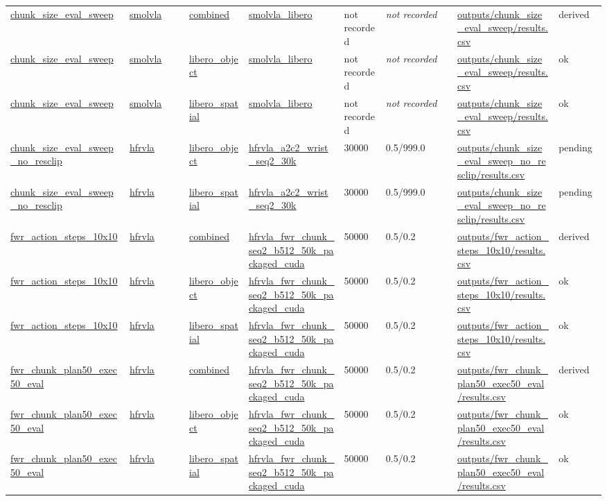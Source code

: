 \begin{scriptsize}
\begin{longtable}{@{}p{0.20\linewidth}p{0.10\linewidth}p{0.10\linewidth}p{0.16\linewidth}p{0.07\linewidth}p{0.12\linewidth}p{0.17\linewidth}p{0.08\linewidth}@{}}
\url{chunk_size_eval_sweep} & \url{smolvla} & \url{combined} & \url{smolvla_libero} & not recorded & \emph{not recorded} & \url{outputs/chunk_size_eval_sweep/results.csv} & derived \\
\url{chunk_size_eval_sweep} & \url{smolvla} & \url{libero_object} & \url{smolvla_libero} & not recorded & \emph{not recorded} & \url{outputs/chunk_size_eval_sweep/results.csv} & ok \\
\url{chunk_size_eval_sweep} & \url{smolvla} & \url{libero_spatial} & \url{smolvla_libero} & not recorded & \emph{not recorded} & \url{outputs/chunk_size_eval_sweep/results.csv} & ok \\
\url{chunk_size_eval_sweep_no_resclip} & \url{hfrvla} & \url{libero_object} & \url{hfrvla_a2c2_wrist_seq2_30k} & 30000 & 0.5/999.0 & \url{outputs/chunk_size_eval_sweep_no_resclip/results.csv} & pending \\
\url{chunk_size_eval_sweep_no_resclip} & \url{hfrvla} & \url{libero_spatial} & \url{hfrvla_a2c2_wrist_seq2_30k} & 30000 & 0.5/999.0 & \url{outputs/chunk_size_eval_sweep_no_resclip/results.csv} & pending \\
\url{fwr_action_steps_10x10} & \url{hfrvla} & \url{combined} & \url{hfrvla_fwr_chunk_seq2_b512_50k_packaged_cuda} & 50000 & 0.5/0.2 & \url{outputs/fwr_action_steps_10x10/results.csv} & derived \\
\url{fwr_action_steps_10x10} & \url{hfrvla} & \url{libero_object} & \url{hfrvla_fwr_chunk_seq2_b512_50k_packaged_cuda} & 50000 & 0.5/0.2 & \url{outputs/fwr_action_steps_10x10/results.csv} & ok \\
\url{fwr_action_steps_10x10} & \url{hfrvla} & \url{libero_spatial} & \url{hfrvla_fwr_chunk_seq2_b512_50k_packaged_cuda} & 50000 & 0.5/0.2 & \url{outputs/fwr_action_steps_10x10/results.csv} & ok \\
\url{fwr_chunk_plan50_exec50_eval} & \url{hfrvla} & \url{combined} & \url{hfrvla_fwr_chunk_seq2_b512_50k_packaged_cuda} & 50000 & 0.5/0.2 & \url{outputs/fwr_chunk_plan50_exec50_eval/results.csv} & derived \\
\url{fwr_chunk_plan50_exec50_eval} & \url{hfrvla} & \url{libero_object} & \url{hfrvla_fwr_chunk_seq2_b512_50k_packaged_cuda} & 50000 & 0.5/0.2 & \url{outputs/fwr_chunk_plan50_exec50_eval/results.csv} & ok \\
\url{fwr_chunk_plan50_exec50_eval} & \url{hfrvla} & \url{libero_spatial} & \url{hfrvla_fwr_chunk_seq2_b512_50k_packaged_cuda} & 50000 & 0.5/0.2 & \url{outputs/fwr_chunk_plan50_exec50_eval/results.csv} & ok \\

\end{longtable}
\end{scriptsize}
